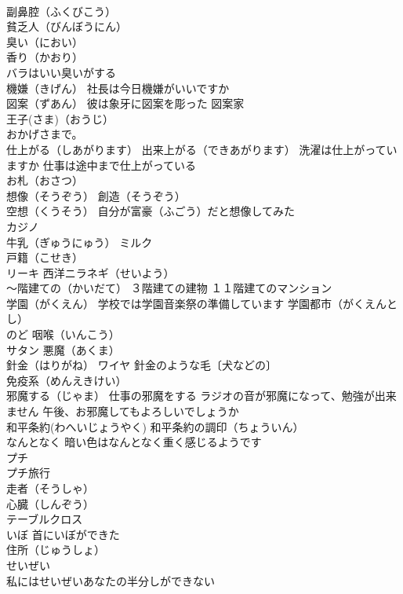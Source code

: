 \documentclass[8pt]{extreport}
\begin{document}
\begin{CJK}{UTF8}{min}
\\	副鼻腔（ふくびこう）
\\	貧乏人（びんぼうにん）
\\	臭い（におい） 
\\	香り（かおり） 
\\	バラはいい臭いがする
\\	機嫌（きげん） 社長は今日機嫌がいいですか
\\	図案（ずあん） 彼は象牙に図案を彫った 図案家
\\	王子(さま)（おうじ）
\\	おかげさまで。
\\	仕上がる（しあがります） 出来上がる（できあがります） 洗濯は仕上がっていますか 仕事は途中まで仕上がっている
\\	お札（おさつ）
\\	想像（そうぞう） 創造（そうぞう）
\\	空想（くうそう） 自分が富豪（ふごう）だと想像してみた
\\	カジノ
\\	牛乳（ぎゅうにゅう） ミルク
\\	戸籍（こせき）
\\	リーキ 西洋ニラネギ（せいよう）
\\	～階建ての（かいだて） ３階建ての建物 １１階建てのマンション
\\	学園（がくえん） 学校では学園音楽祭の準備しています 学園都市（がくえんとし）
\\	のど 咽喉（いんこう）
\\	サタン 悪魔（あくま）
\\	針金（はりがね） ワイヤ 針金のような毛〔犬などの〕
\\	免疫系（めんえきけい）
\\	邪魔する（じゃま） 仕事の邪魔をする ラジオの音が邪魔になって、勉強が出来ません 午後、お邪魔してもよろしいでしょうか
\\	和平条約(わへいじょうやく) 和平条約の調印（ちょういん）
\\	なんとなく 暗い色はなんとなく重く感じるようです
\\	プチ 
\\	プチ旅行
\\	走者（そうしゃ）
\\	心臓（しんぞう）
\\	テーブルクロス
\\	いぼ 首にいぼができた
\\	住所（じゅうしょ）
\\	せいぜい 
\\	私にはせいぜいあなたの半分しができない

\end{CJK}
\end{document}
